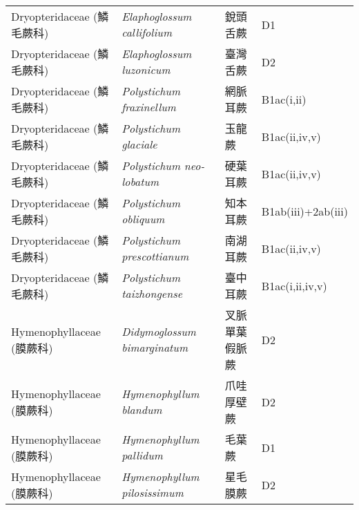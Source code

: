 \begin{longtable}{p{3cm}p{5cm}p{3cm}p{4cm}}
    Dryopteridaceae (鱗毛蕨科) & \textit{Elaphoglossum callifolium}  & 銳頭舌蕨 & D1 \index{Elaphoglossum@\textit{Elaphoglossum}!callifolium@\textit{callifolium}}  \index{銳頭舌蕨} \\
    Dryopteridaceae (鱗毛蕨科) & \textit{Elaphoglossum luzonicum}  & 臺灣舌蕨 & D2 \index{Elaphoglossum@\textit{Elaphoglossum}!luzonicum@\textit{luzonicum}}  \index{臺灣舌蕨} \\
    Dryopteridaceae (鱗毛蕨科) & \textit{Polystichum fraxinellum}  & 網脈耳蕨 & B1ac(i,ii) \index{Polystichum@\textit{Polystichum}!fraxinellum@\textit{fraxinellum}}  \index{網脈耳蕨} \\
    Dryopteridaceae (鱗毛蕨科) & \textit{Polystichum glaciale}  & 玉龍蕨 & B1ac(ii,iv,v) \index{Polystichum@\textit{Polystichum}!glaciale@\textit{glaciale}}  \index{玉龍蕨} \\
    Dryopteridaceae (鱗毛蕨科) & \textit{Polystichum neo-lobatum}  & 硬葉耳蕨 & B1ac(ii,iv,v) \index{Polystichum@\textit{Polystichum}!neo-lobatum@\textit{neo-lobatum}}  \index{硬葉耳蕨} \\
    Dryopteridaceae (鱗毛蕨科) & \textit{Polystichum obliquum}  & 知本耳蕨 & B1ab(iii)+2ab(iii) \index{Polystichum@\textit{Polystichum}!obliquum@\textit{obliquum}}  \index{知本耳蕨} \\
    Dryopteridaceae (鱗毛蕨科) & \textit{Polystichum prescottianum}  & 南湖耳蕨 & B1ac(ii,iv,v) \index{Polystichum@\textit{Polystichum}!prescottianum@\textit{prescottianum}}  \index{南湖耳蕨} \\
    Dryopteridaceae (鱗毛蕨科) & \textit{Polystichum taizhongense}  & 臺中耳蕨 & B1ac(i,ii,iv,v) \index{Polystichum@\textit{Polystichum}!taizhongense@\textit{taizhongense}}  \index{臺中耳蕨} \\
    Hymenophyllaceae (膜蕨科) & \textit{Didymoglossum bimarginatum}  & 叉脈單葉假脈蕨 & D2 \index{Didymoglossum@\textit{Didymoglossum}!bimarginatum@\textit{bimarginatum}}  \index{叉脈單葉假脈蕨} \\
    Hymenophyllaceae (膜蕨科) & \textit{Hymenophyllum blandum}  & 爪哇厚壁蕨 & D2 \index{Hymenophyllum@\textit{Hymenophyllum}!blandum@\textit{blandum}}  \index{爪哇厚壁蕨} \\
    Hymenophyllaceae (膜蕨科) & \textit{Hymenophyllum pallidum}  & 毛葉蕨 & D1 \index{Hymenophyllum@\textit{Hymenophyllum}!pallidum@\textit{pallidum}}  \index{毛葉蕨} \\
    Hymenophyllaceae (膜蕨科) & \textit{Hymenophyllum pilosissimum}  & 星毛膜蕨 & D2 \index{Hymenophyllum@\textit{Hymenophyllum}!pilosissimum@\textit{pilosissimum}}  \index{星毛膜蕨} \\

\end{longtable}
